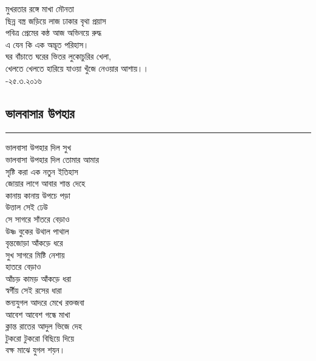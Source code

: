 \documentclass[12pt]{article}
\begin{document}
\noindent
মুখরতার রঙ্গে মাখা মৌনতা\\
ছিন্ন বস্ত্র জড়িয়ে লাজ ঢাকার বৃথা প্রয়াস\\
পবিত্র প্রেমের কন্ঠ আজ অভিনয়ে রুদ্ধ\\
এ যেন কি এক অদ্ভূত পরিহাস।\\
ঘর বাঁচাতে ঘরের ভিতর লুকোচুরির খেলা,\\
খেলতে খেলতে হারিয়ে যাওয়া খুঁজে নেওয়ার আশায়।।\\

-২৫.৩.২০১৬
\newpage

\subsection*{ভালবাসার উপহার }
\hrule
\vspace{1in}
ভালবাসা উপহার দিল সুখ\\
ভালবাসা উপহার দিল তোমার আমার\\
সৃষ্টি করা এক নতুন ইতিহাস\\
জোয়ার লাগে আবার শান্ত দেহে\\
কানায় কানায় উপচে পড়া\\
উত্তাল সেই ঢেউ\\
সে সাগরে সাঁতরে বেড়াও\\
উষ্ণ বুকের উথাল পাথাল\\
বৃন্তজোড়া আঁকড়ে ধরে\\
সুখ সাগরে মিষ্টি নেশায়\\
হাতরে বেড়াও\\
আঁচড় কামড় আঁকড়ে ধরা\\
স্বর্গীয় সেই রসের ধারা\\
স্তন্যযুগল আদরে মেখে রক্তজবা\\
আবেশ আবেশ গন্ধে মাখা\\
ক্লান্ত রাতের আদুল ভিজে দেহ\\
টুকরো টুকরো বিছিয়ে দিয়ে\\
বক্ষ মাঝে যুগল শয়ন। \\
\newpage
\end{document}
